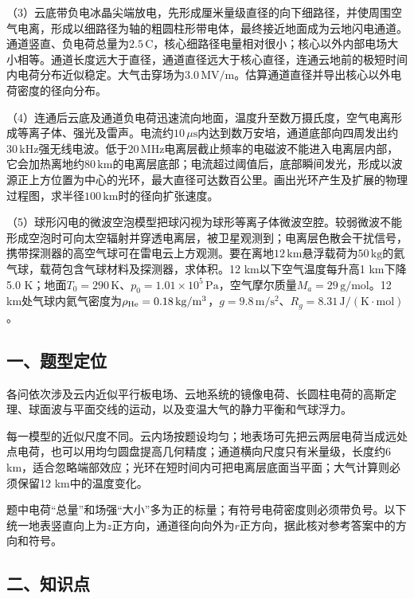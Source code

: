 \documentclass[12pt,a4paper,fontset=fandol]{ctexart}
\begin{document}
（3）云底带负电冰晶尖端放电，先形成厘米量级直径的向下细路径，并使周围空气电离，形成以细路径为轴的粗圆柱形带电体，最终接近地面成为云地闪电通道。通道竖直、负电荷总量为\(2.5\,\mathrm C\)，核心细路径电量相对很小；核心以外内部电场大小相等。通道长度远大于直径，通道直径远大于核心直径，连通云地前的极短时间内电荷分布近似稳定。大气击穿场为\(3.0\,\mathrm{MV/m}\)。估算通道直径并导出核心以外电荷密度的径向分布。

（4）连通后云底及通道负电荷迅速流向地面，温度升至数万摄氏度，空气电离形成等离子体、强光及雷声。电流约\(10\,\mu\mathrm s\)内达到数万安培，通道底部向四周发出约\(30\,\mathrm{kHz}\)强无线电波。低于\(20\,\mathrm{MHz}\)电离层截止频率的电磁波不能进入电离层内部，它会加热离地约\(80\,\mathrm{km}\)的电离层底部；电流超过阈值后，底部瞬间发光，形成以波源正上方位置为中心的光环，最大直径可达数百公里。画出光环产生及扩展的物理过程图，求半径\(100\,\mathrm{km}\)时的径向扩张速度。

（5）球形闪电的微波空泡模型把球闪视为球形等离子体微波空腔。较弱微波不能形成空泡时可向太空辐射并穿透电离层，被卫星观测到；电离层色散会干扰信号，携带探测器的高空气球可在雷电云上方观测。要在离地\(12\,\mathrm{km}\)悬浮载荷为\(50\,\mathrm{kg}\)的氦气球，载荷包含气球材料及探测器，求体积。12
km以下空气温度每升高1 km下降5.0
K；地面\(T_0=290\,\mathrm K\)、\(p_0=1.01\times10^5\,\mathrm{Pa}\)，空气摩尔质量\(M_a=29\,\mathrm{g/mol}\)。12
km处气球内氦气密度为\(\rho_{\rm He}=0.18\,\mathrm{kg/m^3}\)，\(g=9.8\,\mathrm{m/s^2}\)、\(R_g=8.31\,\mathrm{J/(K\cdot mol)}\)。

\subsection{一、题型定位}\label{ux4e00ux9898ux578bux5b9aux4f4d-6}

各问依次涉及云内近似平行板电场、云地系统的镜像电荷、长圆柱电荷的高斯定理、球面波与平面交线的运动，以及变温大气的静力平衡和气球浮力。

每一模型的近似尺度不同。云内场按题设均匀；地表场可先把云两层电荷当成远处点电荷，也可以用均匀圆盘提高几何精度；通道横向尺度只有米量级，长度约6
km，适合忽略端部效应；光环在短时间内可把电离层底面当平面；大气计算则必须保留12
km中的温度变化。

题中电荷``总量''和场强``大小''多为正的标量；有符号电荷密度则必须带负号。以下统一地表竖直向上为\(z\)正方向，通道径向向外为\(r\)正方向，据此核对参考答案中的方向和符号。

\subsection{二、知识点}\label{ux4e8cux77e5ux8bc6ux70b9-6}
\end{document}
